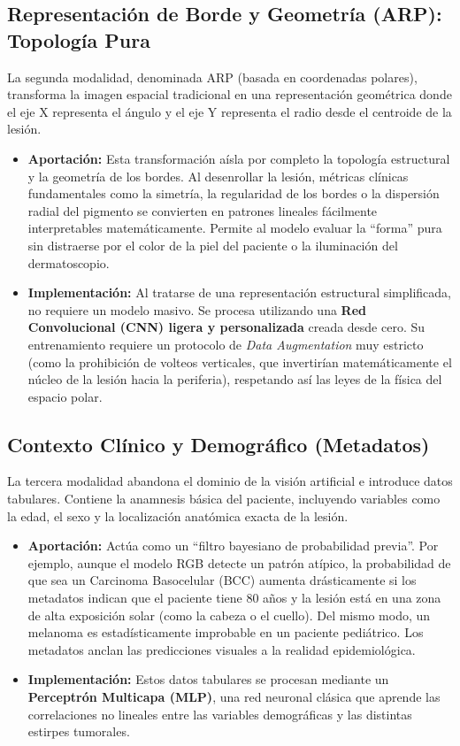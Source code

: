 \subsection{Representación de Borde y Geometría (ARP): Topología Pura}

La segunda modalidad, denominada ARP (basada en coordenadas polares), transforma la imagen espacial tradicional en una representación geométrica donde el eje X representa el ángulo y el eje Y representa el radio desde el centroide de la lesión.

\begin{itemize}
	\item \textbf{Aportación:} Esta transformación aísla por completo la topología estructural y la geometría de los bordes. Al desenrollar la lesión, métricas clínicas fundamentales como la simetría, la regularidad de los bordes o la dispersión radial del pigmento se convierten en patrones lineales fácilmente interpretables matemáticamente. Permite al modelo evaluar la ``forma'' pura sin distraerse por el color de la piel del paciente o la iluminación del dermatoscopio.
	
	\item \textbf{Implementación:} Al tratarse de una representación estructural simplificada, no requiere un modelo masivo. Se procesa utilizando una \textbf{Red Convolucional (CNN) ligera y personalizada} creada desde cero. Su entrenamiento requiere un protocolo de \textit{Data Augmentation} muy estricto (como la prohibición de volteos verticales, que invertirían matemáticamente el núcleo de la lesión hacia la periferia), respetando así las leyes de la física del espacio polar.
\end{itemize}

\subsection{Contexto Clínico y Demográfico (Metadatos)}

La tercera modalidad abandona el dominio de la visión artificial e introduce datos tabulares. Contiene la anamnesis básica del paciente, incluyendo variables como la edad, el sexo y la localización anatómica exacta de la lesión.

\begin{itemize}
	\item \textbf{Aportación:} Actúa como un ``filtro bayesiano de probabilidad previa''. Por ejemplo, aunque el modelo RGB detecte un patrón atípico, la probabilidad de que sea un Carcinoma Basocelular (BCC) aumenta drásticamente si los metadatos indican que el paciente tiene 80 años y la lesión está en una zona de alta exposición solar (como la cabeza o el cuello). Del mismo modo, un melanoma es estadísticamente improbable en un paciente pediátrico. Los metadatos anclan las predicciones visuales a la realidad epidemiológica.
	
	\item \textbf{Implementación:} Estos datos tabulares se procesan mediante un \textbf{Perceptrón Multicapa (MLP)}, una red neuronal clásica que aprende las correlaciones no lineales entre las variables demográficas y las distintas estirpes tumorales.
\end{itemize}

